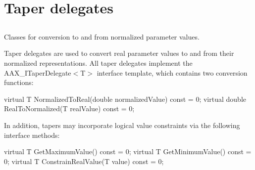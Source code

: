 \hypertarget{a00345}{}\section{Taper delegates}
\label{a00345}


\subsection{ }
Classes for conversion to and from normalized parameter values. 

Taper delegates are used to convert real parameter values to and from their normalized representations. All taper delegates implement the A\+A\+X\+\_\+\+I\+Taper\+Delegate$<$\+T$>$ interface template, which contains two conversion functions\+:


\begin{DoxyCode}
\textcolor{keyword}{virtual} T       NormalizedToReal(\textcolor{keywordtype}{double} normalizedValue) \textcolor{keyword}{const} = 0;
\textcolor{keyword}{virtual} \textcolor{keywordtype}{double}  RealToNormalized(T realValue) \textcolor{keyword}{const} = 0;    
\end{DoxyCode}


In addition, tapers may incorporate logical value constraints via the following interface methods\+:


\begin{DoxyCode}
\textcolor{keyword}{virtual} T       GetMaximumValue()  \textcolor{keyword}{const} = 0;
\textcolor{keyword}{virtual} T       GetMinimumValue() \textcolor{keyword}{const} = 0;
\textcolor{keyword}{virtual} T       ConstrainRealValue(T value) \textcolor{keyword}{const} = 0;
\end{DoxyCode}


